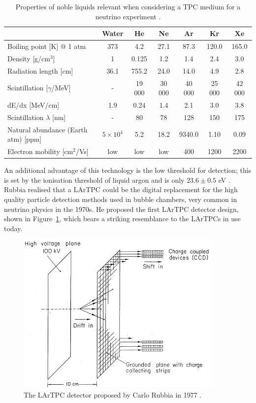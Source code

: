 \begin{table}
  \caption{Properties of noble liquids relevant when considering a TPC medium for a neutrino experiment \cite{Soderberg2008}.}
  \label{tab:NobleProperties}
  \centering
  \begin{tabular}{ l c c c c c c }
    \toprule
     & Water & He & Ne & \color{red} Ar & Kr & Xe \\
    \midrule
    Boiling point [K] @ 1 atm & 373 & 4.2 & 27.1 & \color{red} 87.3 & 120.0 & 165.0 \\
    Density [g/cm$^3$] & 1 & 0.125 & 1.2 & \color{red} 1.4 & 2.4 & 3.0 \\
    Radiation length [cm] & 36.1 & 755.2 & 24.0 & \color{red} 14.0 & 4.9 & 2.8 \\
    Scintillation [$\gamma$/MeV] & - & 19 000 & 30 000 & \color{red} 40 000 & 25 000 & 42 000 \\
    dE/dx [MeV/cm] & 1.9 & 0.24 & 1.4 & \color{red} 2.1 & 3.0 & 3.8 \\
    Scintillation $\lambda$ [nm] & - & 80 & 78 & \color{red} 128 & 150 & 175 \\
    Natural abundance (Earth atm) [ppm] & $5\times 10^4$ & 5.2 & 18.2 & \color{red} 9340.0 & 1.10 & 0.09 \\
    Electron mobility [cm$^2$/Vs] & low & low & low & \color{red} 400 & 1200 & 2200 \\
    \bottomrule
  \end{tabular}
\end{table}

An additional advantage of this technology is the low threshold for detection; this is set by the ionisation threshold of liquid argon and is only $23.6 \pm 0.5$ eV \cite{Chepel2013}.  Rubbia realised that a LArTPC could be the digital replacement for the high quality particle detection methods used in bubble chambers, very common in neutrino physics in the 1970s.  He proposed the first LArTPC detector design, shown in Figure~\ref{fig:RubbiaLArTPC}, which bears a striking resemblance to the LArTPCs in use today.

\begin{figure}
  \centering
  \includegraphics[width=10cm]{RubbiaLArTPC.png}
  \caption[First LArTPC detector, Rubbia (1977)]{The LArTPC detector proposed by Carlo Rubbia in 1977 \cite{Rubbia1977}.}
  \label{fig:RubbiaLArTPC}
\end{figure}

